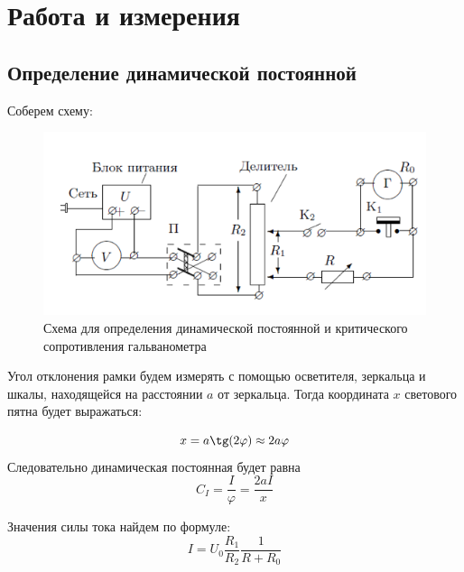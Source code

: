 \documentclass[a4paper, 12pt]{article}
\begin{document}
\section{Работа и измерения}


\subsection*{Определение динамической постоянной}

Соберем схему:

	\begin {figure}[H]
		\begin{center}
			\includegraphics[width = 0.8 \textwidth]{Scheme1}
			\caption{Схема для определения динамической постоянной и критического сопротивления гальванометра}
		\end{center}
	\end {figure}

Угол отклонения рамки будем измерять с помощью осветителя, зеркальца и шкалы, находящейся на расстоянии $a$ от зеркальца. Тогда координата $x$ светового пятна будет выражаться:

$$x=a\tg(2\varphi) \approx 2a\varphi$$
Следовательно динамическая постоянная будет равна 
$$C_I = \dfrac{I}{\varphi} = \dfrac{2aI}{x}$$

Значения силы тока найдем по формуле: $$I = U_0 \dfrac{R_1}{R_2}\dfrac{1}{R+R_0}$$
\end{document}
